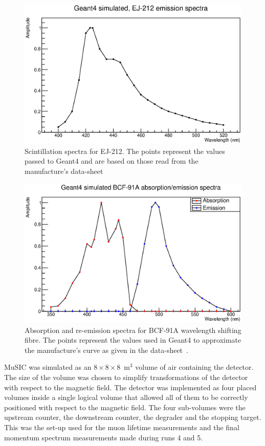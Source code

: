 \begin{figure}[hptb]
  \centering
    \includegraphics[width=.9\textwidth]{images/ej-212-g4.eps}
  \caption{Scintillation spectra for EJ-212. The points represent the values passed to Geant4 and are based on those read from the manufacture's data-sheet~\cite{EJ_212}}
  \label{fig:images_ej-212-g4}
\end{figure}


\begin{figure}[hptb]
  \centering
    \includegraphics[width=.9\textwidth]{images/bcf-91a-g4.eps}
  \caption{Absorption and re-emission spectra for BCF-91A wavelength shifting fibre. The points represent the values used in Geant4 to approximate the manufacture's curve as given in the data-sheet~\cite{BCF-91A}.}
  \label{fig:images_bcf-91a-g4}
\end{figure}


MuSIC was simulated as an \(8\times8\times8\)~m\(^3\) volume of air containing the detector. The size of the volume was chosen to simplify transformations of the detector with respect to the magnetic field. The detector was implemented as four placed volumes inside a single logical volume that allowed all of them to be correctly positioned with respect to the magnetic field. The four sub-volumes were the upstream counter, the downstream counter, the degrader and the stopping target. This was the set-up used for the muon lifetime measurements and the final momentum spectrum measurements made during runs 4 and 5.

